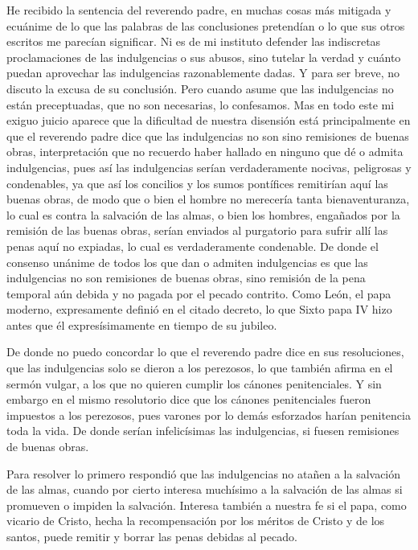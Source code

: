 He recibido la sentencia del reverendo padre, en muchas cosas más mitigada y ecuánime de lo que las palabras de las conclusiones pretendían o lo que sus otros escritos me parecían significar. Ni es de mi instituto defender las indiscretas proclamaciones de las indulgencias o sus abusos, sino tutelar la verdad y cuánto puedan aprovechar las indulgencias razonablemente dadas. Y para ser breve, no discuto la excusa de su conclusión. Pero cuando asume que las indulgencias no están preceptuadas, que no son necesarias, lo confesamos. Mas en todo este mi exiguo juicio aparece que la dificultad de nuestra disensión está principalmente en que el reverendo padre dice que las indulgencias no son sino remisiones de buenas obras, interpretación que no recuerdo haber hallado en ninguno que dé o admita indulgencias, pues así las indulgencias serían verdaderamente nocivas, peligrosas y condenables, ya que así los concilios y los sumos pontífices remitirían aquí las buenas obras, de modo que o bien el hombre no merecería tanta bienaventuranza, lo cual es contra la salvación de las almas, o bien los hombres, engañados por la remisión de las buenas obras, serían enviados al purgatorio para sufrir allí las penas aquí no expiadas, lo cual es verdaderamente condenable. De donde el consenso unánime de todos los que dan o admiten indulgencias es que las indulgencias no son remisiones de buenas obras, sino remisión de la pena temporal aún debida y no pagada por el pecado contrito. Como León, el papa moderno, expresamente definió en el citado decreto, lo que Sixto papa IV hizo antes que él expresísimamente en tiempo de su jubileo.

De donde no puedo concordar lo que el reverendo padre dice en sus resoluciones, que las indulgencias solo se dieron a los perezosos, lo que \marginpar{\small[350]} también afirma en el sermón vulgar, a los que no quieren cumplir los cánones penitenciales. Y sin embargo en el mismo resolutorio dice que los cánones penitenciales fueron impuestos a los perezosos, pues varones por lo demás esforzados harían penitencia toda la vida. De donde serían infelicísimas las indulgencias, si fuesen remisiones de buenas obras.

Para resolver lo primero respondió que las indulgencias no atañen a la salvación de las almas, cuando por cierto interesa muchísimo a la salvación de las almas si promueven o impiden la salvación. Interesa también a nuestra fe si el papa, como vicario de Cristo, hecha la recompensación por los méritos de Cristo y de los santos, puede remitir y borrar las penas debidas al pecado.

